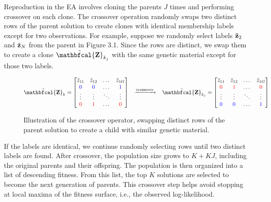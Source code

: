 \documentclass[12pt]{report}
\begin{document}
Reproduction in the EA involves cloning the parents $J$ times and performing crossover on each clone. The crossover operation randomly swaps two distinct rows of the parent solution to create clones with identical membership labels except for two observations. For example, suppose we randomly select labels $\tilde{\bf z}_2$ and $\tilde{\bf z}_N$ from the parent in Figure 3.1. Since the rows are distinct, we swap them to create a clone $\tilde{ \bf \mathbfcal{Z} }_{k_j}$ with the same genetic material except for those two labels.  
\begin{figure}[H]
$$\tilde{\bf {\mathbfcal{Z}}}_{k} = 
\begin{bmatrix} \tilde{z}_{11} & \tilde{z}_{12} & \dots & \tilde{z}_{1G} \\
    \textcolor{blue}{0} & \textcolor{blue}{0} & \dots & \textcolor{blue}{1} \\
    \vdots & \vdots & \ddots & \vdots \\
    \textcolor{red}{0}&\textcolor{red}{1}& \dots & \textcolor{red}{0}\\
\end{bmatrix} 
\;
\;
\;
\xrightarrow{\text{crossover}}
\;
\;
\;
\tilde{ \bf \mathbfcal{Z} }_{k_j} = 
\begin{bmatrix}
    \tilde{z}_{11} & \tilde{z}_{12} & \dots & \tilde{z}_{1G} \\
    \textcolor{red}{0} & \textcolor{red}{1} & \dots & \textcolor{red}{0} \\
    \vdots & \vdots & \ddots & \vdots \\
    \textcolor{blue}{0}&\textcolor{blue}{0}& \dots & \textcolor{blue}{1}\\
\end{bmatrix}   $$
\vspace{-0.5cm}
\caption{Illustration of the crossover operator, swapping distinct rows of the parent solution to create a child with similar genetic material.}
\end{figure}

If the labels are identical, we continue randomly selecting rows until two distinct labels are found. After crossover, the population size grows to $K + KJ$, including the original parents and their offspring. The population is then organized into a list of descending fitness. From this list, the top $K$ solutions are selected to become the next generation of parents. This crossover step helps avoid stopping at local maxima of the fitness surface, i.e., the observed log-likelihood. 
\end{document}
